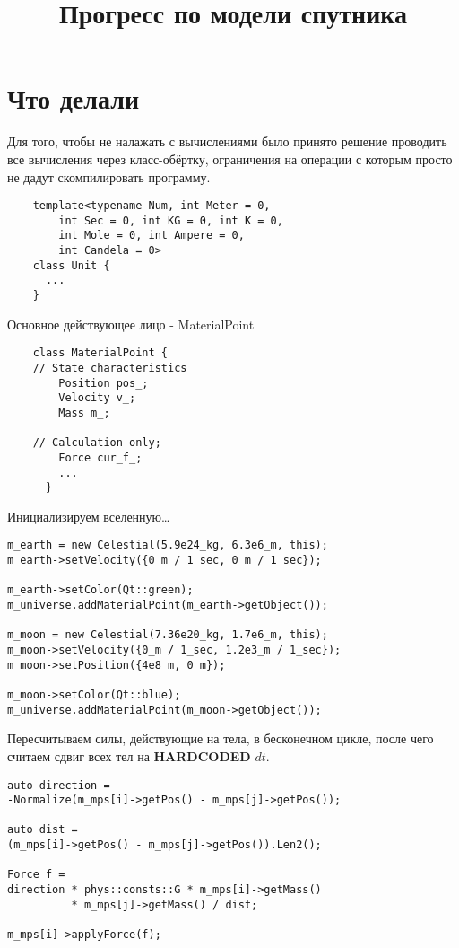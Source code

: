 \documentclass{beamer}
\title{Прогресс по модели спутника}
\begin{document}
\begin{frame}
  \titlepage
\end{frame}

\section{Что делали}

\begin{frame}[fragile]
  Для того, чтобы не налажать с вычислениями было принято решение проводить все вычисления через класс-обёртку, ограничения на операции с которым просто не дадут скомпилировать программу.

  \begin{lstlisting}
    template<typename Num, int Meter = 0, 
        int Sec = 0, int KG = 0, int K = 0, 
        int Mole = 0, int Ampere = 0, 
        int Candela = 0>
    class Unit {
      ...
    }
  \end{lstlisting}
\end{frame}

\begin{frame}[fragile]
  Основное действующее лицо - MaterialPoint

  \begin{lstlisting}
    class MaterialPoint {
    // State characteristics
        Position pos_;
        Velocity v_;
        Mass m_;

    // Calculation only;
        Force cur_f_;
        ...
      }
  \end{lstlisting}
\end{frame}

\begin{frame}[fragile]
  Инициализируем вселенную\dots

  \begin{lstlisting}
m_earth = new Celestial(5.9e24_kg, 6.3e6_m, this);
m_earth->setVelocity({0_m / 1_sec, 0_m / 1_sec});

m_earth->setColor(Qt::green);
m_universe.addMaterialPoint(m_earth->getObject());

m_moon = new Celestial(7.36e20_kg, 1.7e6_m, this);
m_moon->setVelocity({0_m / 1_sec, 1.2e3_m / 1_sec});
m_moon->setPosition({4e8_m, 0_m});

m_moon->setColor(Qt::blue);
m_universe.addMaterialPoint(m_moon->getObject());
  \end{lstlisting}
\end{frame}

\begin{frame}[fragile]
  Пересчитываем силы, действующие на тела, в бесконечном цикле, после чего считаем сдвиг всех тел на \textbf{HARDCODED} $dt$.

  \begin{lstlisting}
auto direction = 
-Normalize(m_mps[i]->getPos() - m_mps[j]->getPos());

auto dist = 
(m_mps[i]->getPos() - m_mps[j]->getPos()).Len2();

Force f = 
direction * phys::consts::G * m_mps[i]->getMass() 
          * m_mps[j]->getMass() / dist;

m_mps[i]->applyForce(f);
  \end{lstlisting}
\end{frame}
\end{document}
